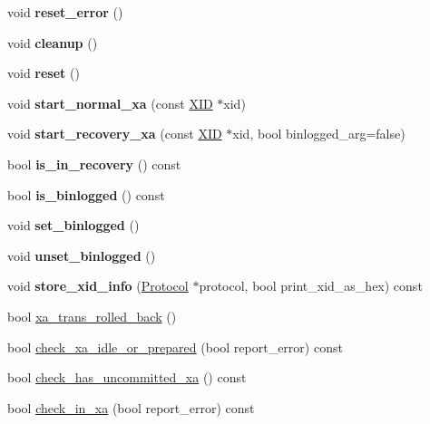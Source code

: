 \begin{DoxyCompactItemize}
void {\bfseries reset\+\_\+error} ()
\item 
\mbox{\label{classXID__STATE_a35ca771775dcd97cdd91c6bc3a998538}} 
void {\bfseries cleanup} ()
\item 
\mbox{\label{classXID__STATE_ad0e31e413254fcfedce267da90e519e1}} 
void {\bfseries reset} ()
\item 
\mbox{\label{classXID__STATE_ad00b918d615ccd11a58f230fec48338d}} 
void {\bfseries start\+\_\+normal\+\_\+xa} (const \mbox{\hyperlink{structxid__t}{X\+ID}} $\ast$xid)
\item 
\mbox{\label{classXID__STATE_a85f99a83bb3e3c6f37bf0c30b26bda7a}} 
void {\bfseries start\+\_\+recovery\+\_\+xa} (const \mbox{\hyperlink{structxid__t}{X\+ID}} $\ast$xid, bool binlogged\+\_\+arg=false)
\item 
\mbox{\label{classXID__STATE_afcccbc63af4b0c3df78bc23ccf01de5f}} 
bool {\bfseries is\+\_\+in\+\_\+recovery} () const
\item 
\mbox{\label{classXID__STATE_a3fd060550bcf2f04fccf7a42958a991a}} 
bool {\bfseries is\+\_\+binlogged} () const
\item 
\mbox{\label{classXID__STATE_ad0d446c7af5049588bdf509833736e1b}} 
void {\bfseries set\+\_\+binlogged} ()
\item 
\mbox{\label{classXID__STATE_a629d7e32f6f067486a149c69acf7e942}} 
void {\bfseries unset\+\_\+binlogged} ()
\item 
\mbox{\label{classXID__STATE_a0173bc32b5f5fccf19e989211b4b50e4}} 
void {\bfseries store\+\_\+xid\+\_\+info} (\mbox{\hyperlink{classProtocol}{Protocol}} $\ast$protocol, bool print\+\_\+xid\+\_\+as\+\_\+hex) const
\item 
bool \mbox{\hyperlink{classXID__STATE_a5ea0c74d50c158009744d26e9631fb40}{xa\+\_\+trans\+\_\+rolled\+\_\+back}} ()
\item 
bool \mbox{\hyperlink{classXID__STATE_a6b29731f4de0b55da2c33ffceea49506}{check\+\_\+xa\+\_\+idle\+\_\+or\+\_\+prepared}} (bool report\+\_\+error) const
\item 
bool \mbox{\hyperlink{classXID__STATE_ac5780b7f325ef65c9c395856c8fa2e23}{check\+\_\+has\+\_\+uncommitted\+\_\+xa}} () const
\item 
bool \mbox{\hyperlink{classXID__STATE_ae60d37b094a4965d5d8de7b8c050d85d}{check\+\_\+in\+\_\+xa}} (bool report\+\_\+error) const
\end{DoxyCompactItemize}


